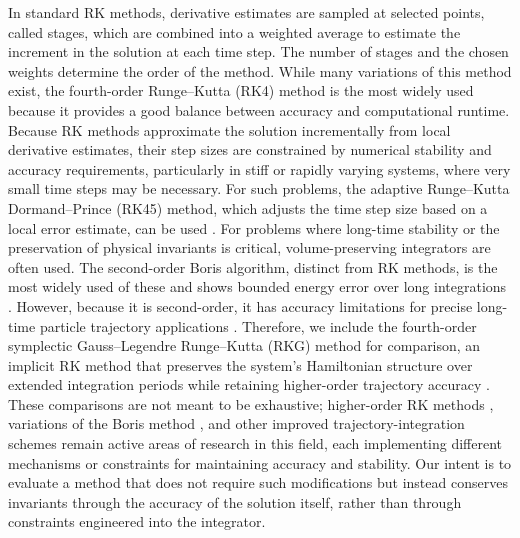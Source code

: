\documentclass{article}
\begin{document}
In standard RK methods, derivative estimates are sampled at selected points, called stages, which are combined into a weighted average to estimate the increment in the solution at each time step. The number of stages and the chosen weights determine the order of the method. While many variations of this method exist, the fourth-order Runge--Kutta (RK4) method is the most widely used \cite{Chapra2021, Walters2022} because it provides a good balance between accuracy and computational runtime. Because RK methods approximate the solution incrementally from local derivative estimates, their step sizes are constrained by numerical stability and accuracy requirements, particularly in stiff or rapidly varying systems, where very small time steps may be necessary. For such problems, the adaptive Runge--Kutta Dormand--Prince (RK45) method, which adjusts the time step size based on a local error estimate, can be used \cite{Chapra2021, Dormand1980}. For problems where long-time stability or the preservation of physical invariants is critical, volume-preserving integrators are often used. The second-order Boris algorithm, distinct from RK methods, is the most widely used of these and shows bounded energy error over long integrations \cite{Qin2013, Ripperda2018}. However, because it is second-order, it has accuracy limitations for precise long-time particle trajectory applications \cite{Qin2013, Ripperda2018, Winkel2015}. Therefore, we include the fourth-order symplectic Gauss--Legendre Runge--Kutta (RKG) method for comparison, an implicit RK method that preserves the system's Hamiltonian structure over extended integration periods while retaining higher-order trajectory accuracy \cite{Iserles1996, Yugo2001, Calvo2003}. These comparisons are not meant to be exhaustive; higher-order RK methods \cite{Walters2022, Meseguer2025}, variations of the Boris method \cite{Wang2025}, and other improved trajectory-integration schemes \cite{Soni2021, Brizard2022, Huang2022, Umeda2023} remain active areas of research in this field, each implementing different mechanisms or constraints for maintaining accuracy and stability. Our intent is to evaluate a method that does not require such modifications but instead conserves invariants through the accuracy of the solution itself, rather than through constraints engineered into the integrator. 
\end{document}
